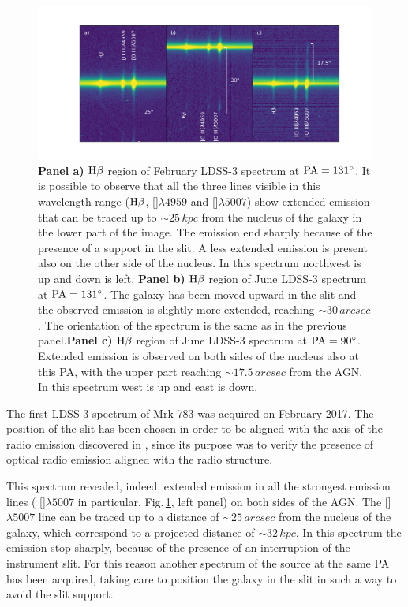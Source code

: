 \documentclass[../thesis.tex]{subfiles}
\begin{document}
\begin{figure}
\centering
\includegraphics[width=1.1\textwidth]{images/paper3/spectra.jpg} 
\caption[]{\textbf{Panel a)} $\rm H\beta$ region of February LDSS-3 spectrum at $\rm PA=\ang{131}$. It is possible to observe that all the three lines visible in this wavelength range ($\rm H\beta$, []$\lambda4959$ and []$\lambda5007$) show extended emission that can be traced up to $\sim 25\,\si{kpc}$ from the nucleus of the galaxy in the lower part of the image. The emission end sharply because of the presence of a support in the slit. A less extended emission is present also on the other side of the nucleus. In this spectrum northwest is up and down is left. \textbf{Panel b)}  $\rm H\beta$ region of June LDSS-3 spectrum at $\rm PA=\ang{131}$. The galaxy has been moved upward in the slit and the observed emission is slightly more extended, reaching $\sim 30\,\si{arcsec}$. The orientation of the spectrum is the same as in the previous panel.\textbf{Panel c)} $\rm H\beta$ region of June LDSS-3 spectrum at $\rm PA=\ang{90}$. Extended emission is observed on both sides of the nucleus also at this PA, with the upper part reaching $\sim 17.5\,\si{arcsec}$ from the AGN. In this spectrum west is up and east is down.}
\label{fig:three_spectra}
\end{figure}


The first LDSS-3 spectrum of Mrk 783 was acquired on February 2017. 
The position of the slit has been chosen in order to be aligned with the axis of the radio emission discovered in \citep{Congiu17}, since its purpose was to verify the presence of optical radio emission aligned with the radio structure.

This spectrum revealed, indeed, extended emission in all the strongest emission lines ( []$\lambda5007$ in particular, Fig.\,\ref{fig:three_spectra}, left panel) on both sides of the AGN.
The []$\lambda5007$ line can be traced up to a distance of $\sim 25\,\si{arcsec}$ from the nucleus of the galaxy, which correspond to a projected distance of $\sim 32\,\si{kpc}$.
In this spectrum the emission stop sharply, because of the presence of an interruption of the instrument slit.
For this reason another spectrum of the source at the same PA has been acquired, taking care to position the galaxy in the slit in such a way to avoid the slit support.
\end{document}
